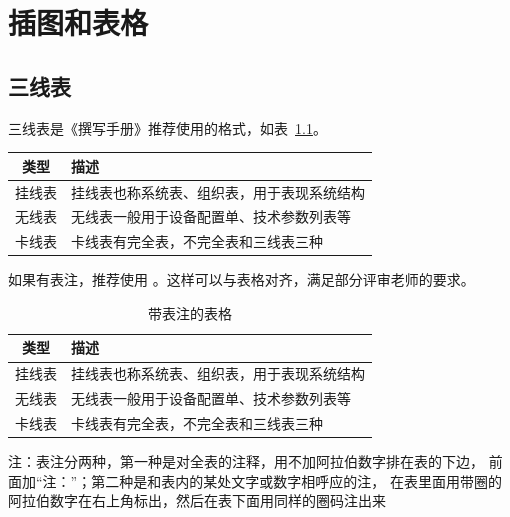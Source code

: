 
\chapter{插图和表格}

\section{三线表}

三线表是《撰写手册》推荐使用的格式，如表~\ref{tab:exampletable}。

\begin{table}
	\centering
	\label{tab:exampletable}
	\begin{tabular}{cl}
		\toprule
		类型   & 描述                                       \\
		\midrule
		挂线表 & 挂线表也称系统表、组织表，用于表现系统结构 \\
		无线表 & 无线表一般用于设备配置单、技术参数列表等   \\
		卡线表 & 卡线表有完全表，不完全表和三线表三种       \\
		\bottomrule
	\end{tabular}
\end{table}

如果有表注，推荐使用 。这样可以与表格对齐，满足部分评审老师的要求。

\begin{table}
	\centering
	\begin{threeparttable}
		\caption{带表注的表格}
		\label{tab:tablewithnotes}
		\begin{tabular}{cl}
			\toprule
			类型   & 描述                                       \\
			\midrule
			挂线表 & 挂线表也称系统表、组织表，用于表现系统结构 \\
			无线表 & 无线表一般用于设备配置单、技术参数列表等   \\
			卡线表 & 卡线表有完全表，不完全表和三线表三种       \\
			\bottomrule
		\end{tabular}
		\begin{tablenotes}[flushleft]
			\item 注：表注分两种，第一种是对全表的注释，用不加阿拉伯数字排在表的下边，
			前面加“注：”；第二种是和表内的某处文字或数字相呼应的注，
			在表里面用带圈的阿拉伯数字在右上角标出，然后在表下面用同样的圈码注出来
		\end{tablenotes}
	\end{threeparttable}
\end{table}

